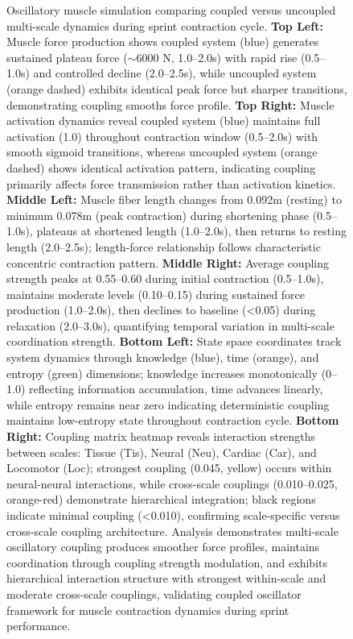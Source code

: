 \begin{figure}[htbp]
    \caption{Oscillatory muscle simulation comparing coupled versus uncoupled multi-scale dynamics during sprint contraction cycle. \textbf{Top Left:} Muscle force production shows coupled system (blue) generates sustained plateau force ($\sim$6000 N, 1.0--2.0s) with rapid rise (0.5--1.0s) and controlled decline (2.0--2.5s), while uncoupled system (orange dashed) exhibits identical peak force but sharper transitions, demonstrating coupling smooths force profile. \textbf{Top Right:} Muscle activation dynamics reveal coupled system (blue) maintains full activation (1.0) throughout contraction window (0.5--2.0s) with smooth sigmoid transitions, whereas uncoupled system (orange dashed) shows identical activation pattern, indicating coupling primarily affects force transmission rather than activation kinetics. \textbf{Middle Left:} Muscle fiber length changes from 0.092m (resting) to minimum 0.078m (peak contraction) during shortening phase (0.5--1.0s), plateaus at shortened length (1.0--2.0s), then returns to resting length (2.0--2.5s); length-force relationship follows characteristic concentric contraction pattern. \textbf{Middle Right:} Average coupling strength peaks at 0.55--0.60 during initial contraction (0.5--1.0s), maintains moderate levels (0.10--0.15) during sustained force production (1.0--2.0s), then declines to baseline (<0.05) during relaxation (2.0--3.0s), quantifying temporal variation in multi-scale coordination strength. \textbf{Bottom Left:} State space coordinates track system dynamics through knowledge (blue), time (orange), and entropy (green) dimensions; knowledge increases monotonically (0--1.0) reflecting information accumulation, time advances linearly, while entropy remains near zero indicating deterministic coupling maintains low-entropy state throughout contraction cycle. \textbf{Bottom Right:} Coupling matrix heatmap reveals interaction strengths between scales: Tissue (Tis), Neural (Neu), Cardiac (Car), and Locomotor (Loc); strongest coupling (0.045, yellow) occurs within neural-neural interactions, while cross-scale couplings (0.010--0.025, orange-red) demonstrate hierarchical integration; black regions indicate minimal coupling (<0.010), confirming scale-specific versus cross-scale coupling architecture. Analysis demonstrates multi-scale oscillatory coupling produces smoother force profiles, maintains coordination through coupling strength modulation, and exhibits hierarchical interaction structure with strongest within-scale and moderate cross-scale couplings, validating coupled oscillator framework for muscle contraction dynamics during sprint performance.}
    \label{fig:muscle_oscillatory_simulation}
    \end{figure}


